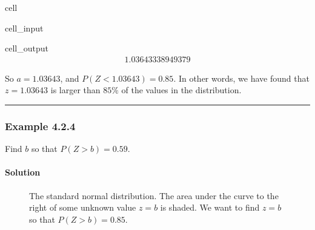 \documentclass[letterpaper,10pt,english]{jupyterBook}
\begin{document}
\begin{sphinxuseclass}{cell}\begin{sphinxVerbatimInput}

\begin{sphinxuseclass}{cell_input}
\begin{sphinxVerbatim}[commandchars=\\\{\}]
\end{sphinxVerbatim}

\end{sphinxuseclass}\end{sphinxVerbatimInput}
\begin{sphinxVerbatimOutput}

\begin{sphinxuseclass}{cell_output}\begin{equation*}
\begin{split}1.03643338949379\end{split}
\end{equation*}
\end{sphinxuseclass}\end{sphinxVerbatimOutput}

\end{sphinxuseclass}
\sphinxAtStartPar
So \(a = 1.03643\), and \(P(Z < 1.03643) = 0.85\). In other words, we have found that \(z = 1.03643\) is larger than \(85\%\) of the values in the distribution.


\bigskip\hrule\bigskip



\subsubsection{Example 4.2.4}
\label{\detokenize{Ch4 The Normal Distribution and the Central Limit Theorem/4.2 The Standard Normal Distribution:example-4-2-4}}
\sphinxAtStartPar
Find \(b\) so that \(P(Z > b) = 0.59\).


\paragraph{Solution}
\label{\detokenize{Ch4 The Normal Distribution and the Central Limit Theorem/4.2 The Standard Normal Distribution:id7}}
\begin{figure}[htbp]
\centering
\capstart

\noindent{}
\caption{The standard normal distribution. The area under the curve to the right of some unknown value \(z = b\) is shaded. We want to find \(z = b\) so that \(P(Z > b) = 0.85\).}\label{\detokenize{Ch4 The Normal Distribution and the Central Limit Theorem/4.2 The Standard Normal Distribution:stdnormal-ex5}}\end{figure}
\end{document}
